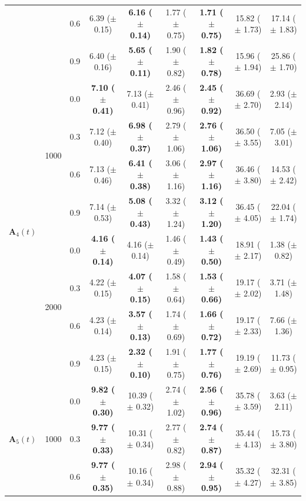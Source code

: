 \begin{table}[htbp]
{\begin{tabular}{lll|cc|cc|cc}
 &  & 0.6 & 6.39 ($\pm$ 0.15) & \textbf{6.16 ($\pm$ 0.14)} & 1.77 ($\pm$ 0.75) & \textbf{1.71 ($\pm$ 0.75)} & 15.82 ($\pm$ 1.73) & 17.14 ($\pm$ 1.83) \\
 &  & 0.9 & 6.40 ($\pm$ 0.16) & \textbf{5.65 ($\pm$ 0.11)} & 1.90 ($\pm$ 0.82) & \textbf{1.82 ($\pm$ 0.78)} & 15.96 ($\pm$ 1.94) & 25.86 ($\pm$ 1.70) \\
\hline
\multirow{8}{*}{$\mathbf{A}_4(t)$} & \multirow{4}{*}{1000} & 0.0 & \textbf{7.10 ($\pm$ 0.41)} & 7.13 ($\pm$ 0.41) & 2.46 ($\pm$ 0.96) & \textbf{2.45 ($\pm$ 0.92)} & 36.69 ($\pm$ 2.70) & 2.93 ($\pm$ 2.14) \\
 &  & 0.3 & 7.12 ($\pm$ 0.40) & \textbf{6.98 ($\pm$ 0.37)} & 2.79 ($\pm$ 1.06) & \textbf{2.76 ($\pm$ 1.06)} & 36.50 ($\pm$ 3.55) & 7.05 ($\pm$ 3.01) \\
 &  & 0.6 & 7.13 ($\pm$ 0.46) & \textbf{6.41 ($\pm$ 0.38)} & 3.06 ($\pm$ 1.16) & \textbf{2.97 ($\pm$ 1.16)} & 36.46 ($\pm$ 3.80) & 14.53 ($\pm$ 2.42) \\
 &  & 0.9 & 7.14 ($\pm$ 0.53) & \textbf{5.08 ($\pm$ 0.43)} & 3.32 ($\pm$ 1.24) & \textbf{3.12 ($\pm$ 1.20)} & 36.45 ($\pm$ 4.05) & 22.04 ($\pm$ 1.74) \\
\cline{2-9}
 & \multirow{4}{*}{2000} & 0.0 & \textbf{4.16 ($\pm$ 0.14)} & 4.16 ($\pm$ 0.14) & 1.46 ($\pm$ 0.49) & \textbf{1.43 ($\pm$ 0.50)} & 18.91 ($\pm$ 2.17) & 1.38 ($\pm$ 0.82) \\
 &  & 0.3 & 4.22 ($\pm$ 0.15) & \textbf{4.07 ($\pm$ 0.15)} & 1.58 ($\pm$ 0.64) & \textbf{1.53 ($\pm$ 0.66)} & 19.17 ($\pm$ 2.02) & 3.71 ($\pm$ 1.48) \\
 &  & 0.6 & 4.23 ($\pm$ 0.14) & \textbf{3.57 ($\pm$ 0.13)} & 1.74 ($\pm$ 0.69) & \textbf{1.66 ($\pm$ 0.72)} & 19.17 ($\pm$ 2.33) & 7.66 ($\pm$ 1.36) \\
 &  & 0.9 & 4.23 ($\pm$ 0.15) & \textbf{2.32 ($\pm$ 0.10)} & 1.91 ($\pm$ 0.75) & \textbf{1.77 ($\pm$ 0.76)} & 19.19 ($\pm$ 2.69) & 11.73 ($\pm$ 0.95) \\
\hline
\multirow{8}{*}{$\mathbf{A}_5(t)$} & \multirow{4}{*}{1000} & 0.0 & \textbf{9.82 ($\pm$ 0.30)} & 10.39 ($\pm$ 0.32) & 2.74 ($\pm$ 1.02) & \textbf{2.56 ($\pm$ 0.96)} & 35.78 ($\pm$ 3.59) & 3.63 ($\pm$ 2.11) \\
 &  & 0.3 & \textbf{9.77 ($\pm$ 0.33)} & 10.31 ($\pm$ 0.34) & 2.77 ($\pm$ 0.82) & \textbf{2.74 ($\pm$ 0.87)} & 35.44 ($\pm$ 4.13) & 15.73 ($\pm$ 3.80) \\
 &  & 0.6 & \textbf{9.77 ($\pm$ 0.35)} & 10.16 ($\pm$ 0.34) & 2.98 ($\pm$ 0.88) & \textbf{2.94 ($\pm$ 0.95)} & 35.32 ($\pm$ 4.27) & 32.31 ($\pm$ 3.85) \\

\end{tabular}}
\end{table}
